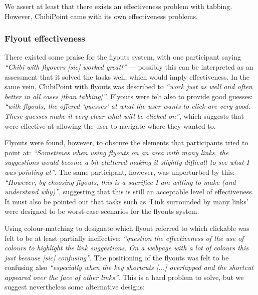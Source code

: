 \documentclass[11pt,openright,a4paper]{report}
\begin{document}
We assert at least that there exists an effectiveness problem with tabbing. However, ChibiPoint came with its own effectiveness problems.

\subsubsection{Flyout effectiveness}
\label{sec:flyout_effectiveness}
There existed some praise for the flyouts system, with one participant saying \textit{``Chibi with flyovers [sic] worked great!''} --- possibly this can be interpreted as an assessment that it solved the tasks well, which would imply effectiveness. In the same vein, ChibiPoint with flyouts was described to \textit{``work just as well and often better in all cases [than tabbing]''}. Flyouts were felt also to provide good guesses: \textit{``with flyouts, the offered `guesses' at what the user wants to click are very good. These guesses make it very clear what will be clicked on''}, which suggests that were effective at allowing the user to navigate where they wanted to.

Flyouts were found, however, to obscure the elements that participants tried to point at: \textit{``Sometimes when using flyouts on an area with many links, the suggestions would become a bit cluttered making it slightly difficult to see what I was pointing at''}. The same participant, however, was unperturbed by this: \textit{``However, by choosing flyouts, this is a sacrifice I am willing to make (and understand why)''}, suggesting that this is still an acceptable level of effectiveness. It must also be pointed out that tasks such as `Link surrounded by many links' were designed to be worst-case scenarios for the flyouts system.

Using colour-matching to designate which flyout referred to which clickable was felt to be at least partially ineffective: \textit{``question the effectiveness of the use of colours to highlight the link suggestions. On a webpage with a lot of colours this just because [sic] confusing''}. The positioning of the flyouts was felt to be confusing also \textit{``especially when the key shortcuts [...] overlapped and the shortcut appeared over the face of other links''}. This is a hard problem to solve, but we suggest nevertheless some alternative designs:
\end{document}
